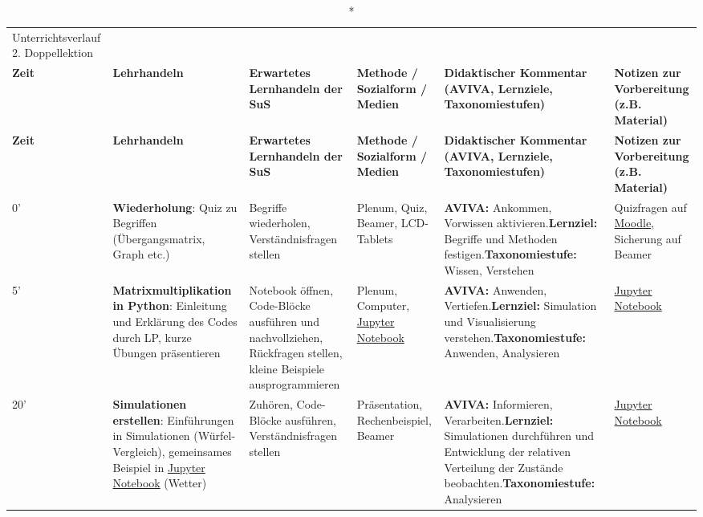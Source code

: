 \begin{landscape}
        \begin{longtable}{@{}l|p{5cm}|p{5cm}|p{4cm}|p{5cm}|p{5cm}@{}}
            \caption*{Unterrichtsverlauf 2. Doppellektion}\\
            \textbf{Zeit} & \textbf{Lehrhandeln} & \textbf{Erwartetes Lernhandeln der SuS} & \textbf{Methode / Sozialform / Medien} & \textbf{Didaktischer Kommentar (AVIVA, Lernziele, Taxonomiestufen)} & \textbf{Notizen zur Vorbereitung (z.B. Material)} \\\midrule\midrule
            \endfirsthead
            \textbf{Zeit} & \textbf{Lehrhandeln} & \textbf{Erwartetes Lernhandeln der SuS} & \textbf{Methode / Sozialform / Medien} & \textbf{Didaktischer Kommentar (AVIVA, Lernziele, Taxonomiestufen)} & \textbf{Notizen zur Vorbereitung (z.B. Material)} \\\midrule\midrule
            \endhead

            0'  & \textbf{Wiederholung}: Quiz zu Begriffen (Übergangsmatrix, Graph etc.) & Begriffe wiederholen, Verständnisfragen stellen & Plenum, Quiz, Beamer, LCD-Tablets & \textbf{AVIVA:} Ankommen, Vorwissen aktivieren.\newline\textbf{Lernziel:} Begriffe und Methoden festigen.\newline\textbf{Taxonomiestufe:} Wissen, Verstehen & Quizfragen auf \href{https://moodle.kzn.ch}{Moodle}, Sicherung auf Beamer \\\midrule

            5'  & \textbf{Matrixmultiplikation in Python}: Einleitung und Erklärung des Codes durch LP, kurze Übungen präsentieren & Notebook öffnen, Code-Blöcke ausführen und nachvollziehen, Rückfragen stellen, kleine Beispiele ausprogrammieren & Plenum, Computer, \href{https://cyrilwendl.github.io/datascience-jupyter/lab/index.html}{Jupyter Notebook} & \textbf{AVIVA:} Anwenden, Vertiefen.\newline\textbf{Lernziel:} Simulation und Visualisierung verstehen.\newline\textbf{Taxonomiestufe:} Anwenden, Analysieren & \href{https://cyrilwendl.github.io/datascience-jupyter/lab/index.html}{Jupyter Notebook} \\\midrule

            20' & \textbf{Simulationen erstellen}: Einführungen in Simulationen (Würfel-Vergleich), gemeinsames Beispiel in \href{https://cyrilwendl.github.io/datascience-jupyter/lab/index.html}{Jupyter Notebook} (Wetter) & Zuhören, Code-Blöcke ausführen, Verständnisfragen stellen & Präsentation, Rechenbeispiel, Beamer & \textbf{AVIVA:} Informieren, Verarbeiten.\newline\textbf{Lernziel:} Simulationen durchführen und Entwicklung der relativen Verteilung der Zustände beobachten.\newline\textbf{Taxonomiestufe:} Analysieren & \href{https://cyrilwendl.github.io/datascience-jupyter/lab/index.html}{Jupyter Notebook} \\\midrule


\end{longtable}
\end{landscape}
